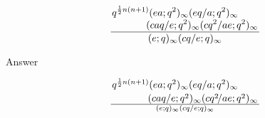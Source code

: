 $$
{
  { \displaystyle q^{{1\over2}n(n+1)}(ea;q^2)_{\infty}(eq/a;q^2)_{\infty} \qquad\hfill
    \atop
    \displaystyle \hfill (caq/e;q^2)_{\infty}(cq^2/ae;q^2)_{\infty}
  }
  \over
  (e;q)_{\infty}(cq/e;q)_{\infty}
}
$$

Answer

$$\def\\#1;{(#1;q^2)_\infty} %
\displaystyle{q^{{1\over2}n(n+1)}\\ea;\\eq/a;\qquad\atop
\hfill\\caq/e;\\cq^2\!/ae;}
\over(e;q)_\infty(cq/e;q)_\infty$$

\bye


